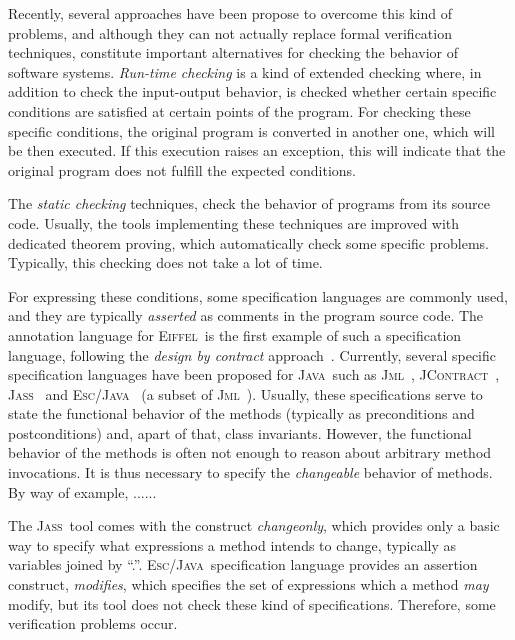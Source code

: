 \documentclass[a4paper]{llncs}
\newcommand{\jml}{\textsc{Jml}}
\newcommand{\escj}{\textsc{Esc/Java}}
\newcommand{\jass}{\textsc{Jass}}
\newcommand{\jcontract}{\textsc{JContract}}
\newcommand{\java}{\textsc{Java}}
\newcommand{\eiff}{\textsc{Eiffel}}
\newcommand{\modifies}{\textit{modifies}}
\begin{document}
Recently, several approaches have been
propose to overcome this kind of problems, and although they can not
actually replace formal verification techniques, constitute
important alternatives for checking the behavior of software
systems. \emph{Run-time
checking} is a kind of extended checking where, in addition to check
the input-output behavior, is checked whether certain specific
conditions are
satisfied at certain points of the program. For checking these
specific conditions, the original program is converted in another one,
which will be then executed. If this execution raises an exception,
this will indicate that the original program does not fulfill the
expected conditions.

The \emph{static checking} techniques, check the behavior of programs
from its source code. Usually, the tools implementing these
techniques are improved with dedicated theorem proving, which
automatically check some specific problems. Typically, this checking
does not take a lot of time.

For expressing these conditions, some specification languages are
commonly used, and they are typically \emph{asserted} as comments in
the
program source code. The annotation language for \eiff~is the first
example of such a specification language, following the \emph{design
by contract} approach~\cite{Mey97}. Currently, several specific
specification languages have been proposed for \java~such as
\jml~\cite{LBR00}, \jcontract~\cite{JContractUrl},
\jass~\cite{JassUrl} and \escj~\cite{LeinoNS00} (a subset of
\jml~\cite{EscJmlDiff}). Usually, these specifications serve to state
the functional behavior of the methods (typically as preconditions and
postconditions) and, apart of that, class invariants. However, the
functional behavior of the methods is often not enough to reason about
arbitrary method invocations. It is thus necessary to specify the
\emph{changeable} behavior of methods. By way of example, ......

The \jass~tool comes with the construct \textit{changeonly}, which
provides only a basic way to specify what expressions a method intends
to change, typically as variables joined by ``.''. \escj~specification
language provides an assertion construct,
\modifies, which specifies the set of expressions which a method
\emph{may} modify, but its tool does not check these kind of
specifications. Therefore, some verification problems occur.
\end{document}
